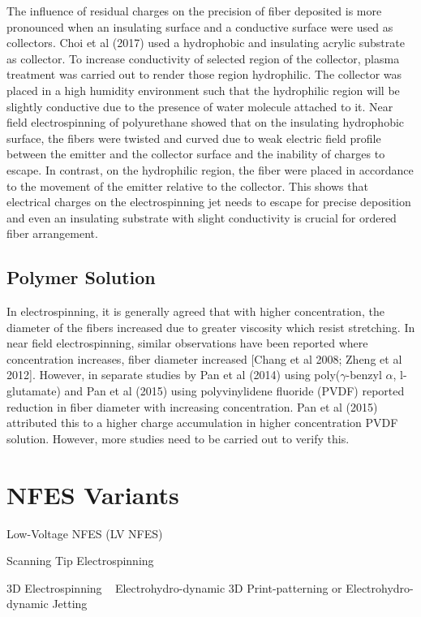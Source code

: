 \documentclass[3p,,preprint,12pt]{elsarticle}
\begin{document}
The influence of residual charges on the precision of fiber deposited is more pronounced when an insulating surface and a conductive surface were used as collectors. Choi et al (2017) used a hydrophobic and insulating acrylic substrate as collector. To increase conductivity of selected region of the collector, plasma treatment was carried out to render those region hydrophilic. The collector was placed in a high humidity environment such that the hydrophilic region will be slightly conductive due to the presence of water molecule attached to it. Near field electrospinning of polyurethane showed that on the insulating hydrophobic surface, the fibers were twisted and curved due to weak electric field profile between the emitter and the collector surface and the inability of charges to escape. In contrast, on the hydrophilic region, the fiber were placed in accordance to the movement of the emitter relative to the collector. This shows that electrical charges on the electrospinning jet needs to escape for precise deposition and even an insulating substrate with slight conductivity is crucial for ordered fiber arrangement.



\subsection{Polymer Solution}In electrospinning, it is generally agreed that with higher concentration, the diameter of the fibers increased due to greater viscosity which resist stretching. In near field electrospinning, similar observations have been reported where concentration increases, fiber diameter increased [Chang et al 2008; Zheng et al 2012]. However, in separate studies by Pan et al (2014) using poly(\ensuremath{\gamma }-benzyl \ensuremath{\alpha }, l-glutamate) and Pan et al (2015) using polyvinylidene fluoride (PVDF) reported reduction in fiber diameter with increasing concentration. Pan et al (2015) attributed this to a higher charge accumulation in higher concentration PVDF solution. However, more studies need to be carried out to verify this.
    
\section{NFES Variants}
Low-Voltage NFES (LV NFES) \unskip~\cite{527120:11973130}

Scanning Tip Electrospinning \unskip~\cite{527120:11974306}

3D Electrospinning \unskip~\cite{527120:11974313} \mbox{}\protect\newline Electrohydro-dynamic 3D Print-patterning or Electrohydro-dynamic Jetting \unskip~\cite{527120:11974310}
\end{document}
